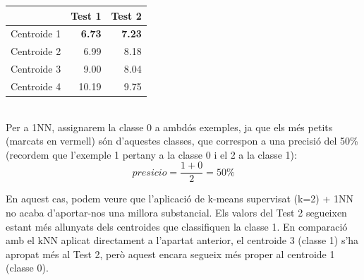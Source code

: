 \documentclass{article} %
\begin{document}
{	{\selectfont\small
	\begin{tabular}{r | r r}
	 	& Test 1 & Test 2 \\ \hline
		Centroide 1 & {\color{red} \textbf{6.73}} & {\color{red} \textbf{7.23}} \\
		Centroide 2 & 6.99 & 8.18 \\
		Centroide 3 & 9.00 & 8.04 \\
		Centroide 4 & 10.19 & 9.75 \\
	\end{tabular}
	} \\

	Per a 1NN, assignarem la classe 0 a ambdós exemples, ja que els més petits (marcats en vermell) són d’aquestes classes, que correspon a una precisió del 50\% (recordem que l'exemple 1 pertany a la classe 0 i el 2 a la classe 1): \\
	\[presicio = \frac{1 + 0}{2} = 50\%\]

	En aquest cas, podem veure que l'aplicació de k-means supervisat (k=2) + 1NN no acaba d'aportar-nos una millora substancial. Els valors del Test 2 segueixen estant més allunyats dels centroides que classifiquen la classe 1. En comparació amb el kNN aplicat directament a l'apartat anterior, el centroide 3 (classe 1) s'ha apropat més al Test 2, però aquest encara segueix més proper al centroide 1 (classe 0). \\
}
\end{document}
